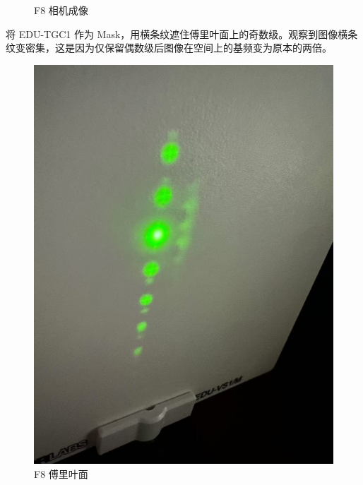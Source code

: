 \documentclass{ctexart}
\begin{document}
\begin{figure}[H]
\begin{minipage}[b]{0.3\textwidth}
    \caption{F8 相机成像}
  \end{minipage}
\end{figure}

将 EDU-TGC1 作为 Mask，用横条纹遮住傅里叶面上的奇数级。观察到图像横条纹变密集，这是因为仅保留偶数级后图像在空间上的基频变为原本的两倍。
\begin{figure}[H]
  \centering
  \begin{minipage}[b]{0.2\textwidth}
    \centering
    \includegraphics[width=\textwidth]{pictures/微信图片_20241017164851.jpg}
    \caption{F8 傅里叶面}
  \end{minipage}
  \hspace{0.1\textwidth} %
  \begin{minipage}[b]{0.3\textwidth}
    \centering

\end{minipage}
\end{figure}
\end{document}
